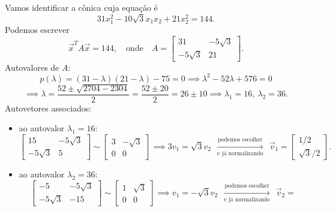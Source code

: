 \begin{ex}
	Vamos identificar a cônica cuja equação é
	\begin{equation}
	31 x_1^2 - 10\sqrt{3} x_1x_2 + 21 x_2^2 = 144.
	\end{equation} Podemos escrever
	\begin{equation}
	\vec{x}^T A \vec{x} = 144, \quad \text{onde} \quad
	A =
	\begin{bmatrix}
	31 & -5\sqrt{3} \\
	-5\sqrt{3} &  21
	\end{bmatrix}.
	\end{equation} Autovalores de $A$:
	\begin{equation}
	p(\lambda) = (31 - \lambda)(21-\lambda) - 75 = 0 \implies \lambda^2 - 52 \lambda + 576
	= 0
	\end{equation}
	\begin{equation}
	\implies \lambda = \frac{52 \pm \sqrt{2704 - 2304}}{2} = \frac{52 \pm 20}{2} = 26\pm 10 \implies \lambda_1 = 16, \ \lambda_2 = 36.
	\end{equation} Autovetores associados:
	\begin{itemize}
		\item  ao autovalor $\lambda_1 = 16$:
		\begin{equation}
		\begin{bmatrix}
		15 & -5\sqrt{3} \\
		-5\sqrt{3} &  5
		\end{bmatrix} \sim
		\begin{bmatrix}
		3 & -\sqrt{3} \\
		0 &  0
		\end{bmatrix} \implies
		3v_1 = \sqrt{3} v_2 \ \ \xrightarrow[\text{e já normalizando}]{\text{podemos escolher}} \ \  \vec{v}_1 =
		\begin{bmatrix}
		1/2 \\ \sqrt{3}/2
		\end{bmatrix}.
		\end{equation}
		\item ao autovalor $\lambda_2 = 36$:
		\begin{equation}
		\begin{bmatrix}
		-5 & -5\sqrt{3} \\
		-5\sqrt{3} &  -15
		\end{bmatrix} \sim
		\begin{bmatrix}
		1 & \sqrt{3} \\
		0 &  0
		\end{bmatrix} \implies
		v_1 = - \sqrt{3} v_2 \ \ \xrightarrow[\text{e já normalizando}]{\text{podemos escolher}} \ \  \vec{v}_2 =

\end{equation}
\end{itemize}
\end{ex}
